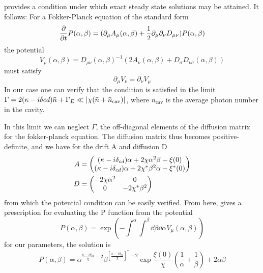 \cite{Haken1975} provides a condition under which exact steady state solutions may be attained. It follows:
For a Fokker-Planck equation of the standard form 
\begin{equation}
  \pdv{t}P(\alpha, \beta) = (\partial_\mu A_\mu (\alpha, \beta) + \frac{1}{2} \partial_\mu \partial_\nu D_{\mu\nu}) P(\alpha, \beta) 
  \label{fokker_planck}
\end{equation}
the potential
\begin{equation}
  V_\rho(\alpha, \beta) = D_{\rho\nu}(\alpha, \beta)^{-1} (2A_\nu(\alpha, \beta) + D_\sigma D_{\nu\sigma}(\alpha, \beta))
\end{equation}
must satisfy
\begin{equation}
  \partial_\mu V_\nu = \partial_\nu V_\mu
\end{equation}
In our case one can verify that the condition is satisfied in the limit $\Gamma = 2(\kappa - i\delta{cd})\bar{n} + \Gamma_E \ll \abs{\chi( \bar{n} + \bar{n}_{\text{cav}} )}$, where $\bar{n}_{\text{cav}}$ is the average photon number in the cavity.

In this limit we can neglect $\Gamma$, the off-diagonal elements of the diffusion matrix for the fokker-planck equation.
The diffusion matrix thus becomes positive-definite, and we have for the drift A and diffusion D
\begin{align}
  A  &= \begin{pmatrix}
  \mqty{(\kappa - i\delta_{cd})\alpha + 2\chi\alpha^2 \beta - \xi(0)\\ (\kappa - i\delta_{cd})\alpha + 2\chi^* \beta^2 \alpha - \xi^*(0)}
       \end{pmatrix}\\
  D  &= \begin{pmatrix}
       \mqty{-2\chi\alpha^2 & 0 \\ 0 & -2 \chi^* \beta^2 }
       \end{pmatrix}
\end{align}
from which the potential condition can be easily verified. 
From here, \cite{Haken1975} gives a prescription for evaluating the P function from the potential
\begin{equation}
  P(\alpha, \beta) = \exp \left( - \int^\alpha \int^\beta \dd{\beta}\dd{\alpha} V_\mu (\alpha, \beta) \right)
\end{equation}
for our parameters, the solution is 
\begin{equation}
  P(\alpha, \beta) = \alpha^{\frac{\kappa-i\delta_{cd}}{\chi}-2} \beta^{{\left[\frac{\kappa-i\delta_{cd}}{\chi}\right]}^*-2}\exp{\frac{\xi(0)}{\chi}\left(\frac{1}{\alpha} + \frac{1}{\beta}\right) + 2\alpha\beta}
\end{equation}
